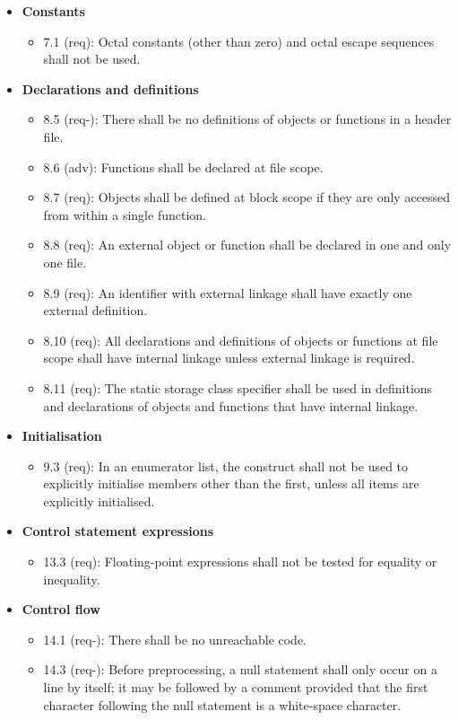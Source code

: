 \begin{itemize}
\begin{itemize}
\end{itemize}
\item \textbf{Constants}
\begin{itemize}
\item 7.1 (req): Octal constants (other than zero) and octal escape sequences shall not be used.
\end{itemize}
\item \textbf{Declarations and definitions}
\begin{itemize}
\item 8.5 (req-): There shall be no definitions of objects or functions in a header file.
\item 8.6 (adv): Functions shall be declared at file scope.
\item 8.7 (req): Objects shall be defined at block scope if they are only accessed from within a single function.
\item 8.8 (req): An external object or function shall be declared in one and only one file.
\item 8.9 (req): An identifier with external linkage shall have exactly one external definition.
\item 8.10 (req): All declarations and definitions of objects or functions at file scope shall have internal linkage unless external linkage is required.
\item 8.11 (req): The static storage class specifier shall be used in definitions and declarations of objects and functions that have internal linkage.
\end{itemize}
\item \textbf{Initialisation}
\begin{itemize}
\item 9.3 (req): In an enumerator list, the \inl{=} construct shall not be used to explicitly initialise members other than the first, unless all items are explicitly initialised.
\end{itemize}
\item \textbf{Control statement expressions}
\begin{itemize}
\item 13.3 (req): Floating-point expressions shall not be tested for equality or inequality.
\end{itemize}
\item \textbf{Control flow}
\begin{itemize}
\item 14.1 (req-): There shall be no unreachable code.
\item 14.3 (req-): Before preprocessing, a null statement shall only occur on a line by itself; it may be followed by a comment provided that the first character following the null statement is a white-space character.

\end{itemize}
\end{itemize}
